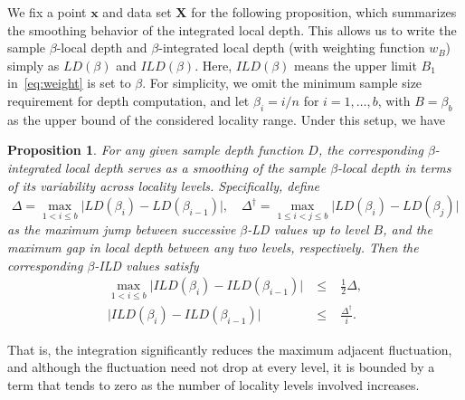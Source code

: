 \documentclass[final,3p,times]{elsarticle}
\newtheorem{pro}{\bf Proposition}[section]
\newcommand{\vecx}{\mathbf{x}}
\newcommand{\vecX}{\mathbf{X}}
\begin{document}
We fix a point $\vecx$ and data set $\vecX$ for the following proposition, which summarizes the smoothing behavior of the integrated local depth.  This allows us to write the sample $\beta$-local depth and $\beta$-integrated local depth (with weighting function $w_B$) simply as $LD(\beta)$ and $ILD(\beta)$. Here, $ILD(\beta)$ means the upper limit $B_1$ in~\eqref{eq:weight} is set to $\beta$. For simplicity, we omit the minimum sample size requirement for depth computation, and let $\beta_i = i/n$ for $i = 1, \ldots, b$, with $B = \beta_b$ as the upper bound of the considered locality range. Under this setup, we have
\begin{pro}\label{pro:1}
For any given sample depth function $ D $, the corresponding $\beta$-integrated local depth serves as a smoothing of the sample $\beta$-local depth in terms of its variability across locality levels. Specifically, define
$$
\Delta = \max_{1 < i \le b} \bigl| LD(\beta_i) - LD(\beta_{i-1}) \bigr| ,\quad\Delta^\dagger
=\max_{1\le i<j\le b}\bigl|LD(\beta_i)-LD(\beta_j)\bigr|
$$
as the maximum jump between successive $\beta$-LD values up to level $B$, and the maximum gap in local depth between any two levels, respectively. Then the corresponding $\beta$-ILD values satisfy
\begin{eqnarray}
    \max_{1 < i \le b} \bigl| ILD(\beta_i) - ILD(\beta_{i-1}) \bigr| &\;\le\;& \tfrac{1}{2} \Delta,\\
   \bigl|ILD(\beta_i)-ILD(\beta_{i-1})\bigr| &\;\le\;& \frac{\Delta^\dagger}{i}.
\end{eqnarray}
\end{pro}
That is, the integration significantly reduces the maximum adjacent fluctuation, and although the fluctuation need not drop at every level, it is bounded by a term that tends to zero as the number of locality levels involved increases.
\end{document}
